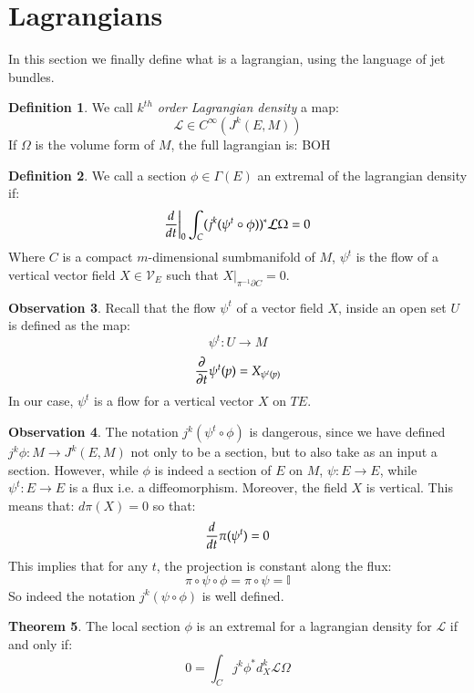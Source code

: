 \documentclass[12pt,a4paper]{report}
\theoremstyle{definition}
\newtheorem{Def}{Definition}[chapter]
\theoremstyle{Theorem}
\newtheorem{Theo}[Def]{Theorem}
\theoremstyle{break}
\theoremstyle{definition}
\newtheorem{Obs}[Def]{Observation}
\begin{document}
		\section{Lagrangians}
		In this section we finally define what is a lagrangian, using the language of jet bundles.
		\begin{Def}
			We call \textit{$k^{th}$ order Lagrangian density} a map:
			$$\mathcal{L}\in C^\infty(J^k(E,M))$$
			If $\Omega$ is the volume form of $M$, the full lagrangian is: BOH  
		\end{Def}
		\begin{Def}
			We call a section $\phi\in\Gamma(E)$ an extremal of the lagrangian density if:
			$${d\over dt}\bigg|_0\int_C(j^k(\psi^t\circ \phi))^*\mathcal{L}\Omega=0$$
			Where $C$ is a compact $m$-dimensional sumbmanifold of $M$, $\psi^t$ is the flow of a vertical vector field $X\in\mathcal{V}_E$ such that $X\big|_{\pi^{-1}\partial C}=0$.
		\end{Def}
		\begin{Obs}
			Recall that the flow $\psi^t$ of a vector field $X$, inside an open set $U$ is defined as the map:
			$$\psi^t:U\rightarrow M$$
			$${\partial\over \partial t}\psi^t(p)=X_{\psi^t(p)}$$
			In our case, $\psi^t$ is a flow for a vertical vector $X$ on $TE$.
		\end{Obs}
		\begin{Obs}
			The notation $j^k(\psi^t\circ \phi)$ is dangerous, since we have defined $j^k\phi:M\rightarrow J^k(E,M)$ not only to be a section, but to also take as an input a section. However, while $\phi$ is indeed a section of $E$ on $M$, $\psi:E\rightarrow E$, while $\psi^t:E\rightarrow E$ is a flux i.e. a diffeomorphism. Moreover, the field $X$ is vertical. This means that: $d\pi(X)=0$ so that:
			$${d\over dt}\pi(\psi^t)=0$$
			This implies that for any $t$, the projection is constant along the flux:
			$$\pi\circ\psi\circ \phi=\pi\circ\psi=\mathbb{I} $$
			So indeed the notation $j^k(\psi\circ\phi)$ is well defined.
		\end{Obs}
		\begin{Theo}
			The local section $\phi$ is an extremal for a lagrangian density for $\mathcal{L}$ if and only if:
			$$0=\int_C j^k\phi^* d^k_{X}\mathcal{L}\Omega$$
		\end{Theo}
\end{document}

